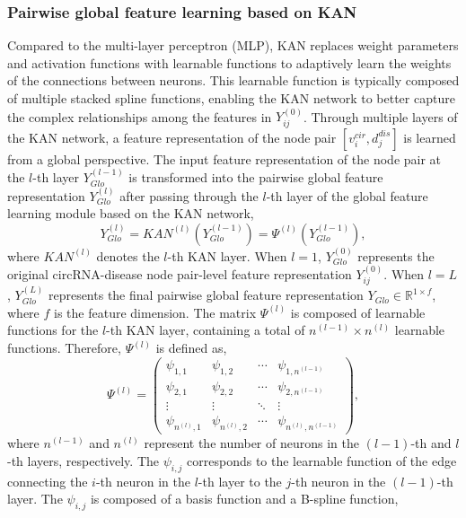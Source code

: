 \documentclass{bioinfo}
\begin{document}
\begin{methods}
\subsubsection{Pairwise global feature learning based on KAN}
Compared to the multi-layer perceptron (MLP), KAN replaces weight parameters and activation functions with learnable functions to adaptively learn the weights of the connections between neurons. This learnable function is typically composed of multiple stacked spline functions, enabling the KAN network to better capture the complex relationships among the features in ${Y_{ij}^{(0)}}$. Through multiple layers of the KAN network, a feature representation of the node pair $[v_i^{cir}, d_j^{dis}]$ is learned from a global perspective. The input feature representation of the node pair at the $l$-th layer $Y_{Glo}^{(l - 1)}$ is transformed into the pairwise global feature representation ${Y}_{Glo}^{(l)}$ after passing through the $l$-th layer of the global feature learning module based on the KAN network,
\begin{equation}
    {Y}_{Glo}^{(l)} = KAN^{(l)}(Y_{Glo}^{(l - 1)}) = \varPsi^{(l)}(Y_{Glo}^{(l - 1)}),
\end{equation}
where $KAN^{(l)}$ denotes the $l$-th KAN layer. When $l=1$, $Y_{Glo}^{(0)}$ represents the original circRNA-disease node pair-level feature representation $Y_{ij}^{(0)}$. When $l=L$, $Y_{Glo}^{(L)}$ represents the final pairwise global feature representation ${Y}_{Glo} \in \mathbb{R}^{1\times f}$, where $f$ is the feature dimension. The matrix $\varPsi^{(l)}$ is composed of learnable functions for the $l$-th KAN layer, containing a total of $n^{(l - 1)} \times n^{(l)}$ learnable functions. Therefore, $\varPsi^{(l)}$ is defined as,
\begin{equation}
    \varPsi^{(l)} = \left(
    \begin{array}{cccc}
        \psi_{1,1} & \psi_{1,2} & \cdots & \psi_{1,n^{(l-1)}} \\
        \psi_{2,1} & \psi_{2,2} & \cdots & \psi_{2,n^{(l-1)}} \\
        \vdots & \vdots & \ddots & \vdots \\
        \psi_{n^{(l)},1} & \psi_{n^{(l)},2} & \cdots & \psi_{n^{(l)},n^{(l-1)}}
    \end{array}
    \right),
\end{equation}
where $n^{(l - 1)}$ and $n^{(l)}$ represent the number of neurons in the $(l - 1)$-th and $l$-th layers, respectively. The $\psi_{i,j}$ corresponds to the learnable function of the edge connecting the $i$-th neuron in the $l$-th layer to the $j$-th neuron in the $(l - 1)$-th layer. The $\psi_{i,j}$ is composed of a basis function and a B-spline function,

\end{methods}
\end{document}
